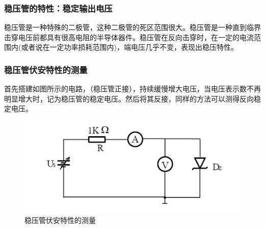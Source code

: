 \documentclass{ctexart}
\begin{document}
\subsubsection{稳压管的特性：稳定输出电压}
稳压管是一种特殊的二极管，这种二极管的死区范围很大。稳压管是一种直到临界击穿电压前都具有很高电阻的半导体器件。稳压管在反向击穿时，在一定的电流范围内(或者说在一定功率损耗范围内)，端电压几乎不变，表现出稳压特性。
\subsubsection{稳压管伏安特性的测量}
首先搭建如图所示的电路，（稳压管正接），持续缓慢增大电压，当电压表示数不再明显增大时，记为稳压管的稳定电压。然后将其反接，同样的方法可以测得反向稳定电压。
\begin{figure}\label{稳压管伏安特性的测量}
    \centering
    \includegraphics[scale=1.2]{./pictures/稳压管伏安特性的测量.png}
    \caption{稳压管伏安特性的测量}
\end{figure}
\end{document}
